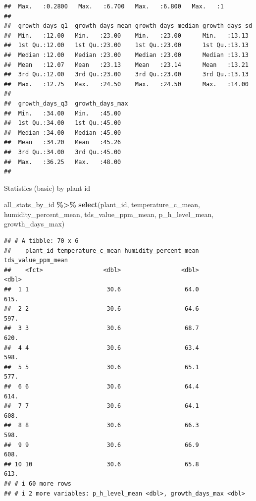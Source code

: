 \documentclass[
]{article}
\newenvironment{Shaded}{\begin{snugshade}}{\end{snugshade}}
\newcommand{\FunctionTok}[1]{\textcolor[rgb]{0.13,0.29,0.53}{\textbf{#1}}}
\newcommand{\NormalTok}[1]{#1}
\newcommand{\SpecialCharTok}[1]{\textcolor[rgb]{0.81,0.36,0.00}{\textbf{#1}}}
\begin{document}
\begin{verbatim}
##  Max.   :0.2800   Max.   :6.700   Max.   :6.800   Max.   :1      
##                                                                  
##  growth_days_q1  growth_days_mean growth_days_median growth_days_sd 
##  Min.   :12.00   Min.   :23.00    Min.   :23.00      Min.   :13.13  
##  1st Qu.:12.00   1st Qu.:23.00    1st Qu.:23.00      1st Qu.:13.13  
##  Median :12.00   Median :23.00    Median :23.00      Median :13.13  
##  Mean   :12.07   Mean   :23.13    Mean   :23.14      Mean   :13.21  
##  3rd Qu.:12.00   3rd Qu.:23.00    3rd Qu.:23.00      3rd Qu.:13.13  
##  Max.   :12.75   Max.   :24.50    Max.   :24.50      Max.   :14.00  
##                                                                     
##  growth_days_q3  growth_days_max
##  Min.   :34.00   Min.   :45.00  
##  1st Qu.:34.00   1st Qu.:45.00  
##  Median :34.00   Median :45.00  
##  Mean   :34.20   Mean   :45.26  
##  3rd Qu.:34.00   3rd Qu.:45.00  
##  Max.   :36.25   Max.   :48.00  
## 
\end{verbatim}

Statistics (basic) by plant id

\begin{Shaded}
\begin{Highlighting}[]
\NormalTok{all\_stats\_by\_id }\SpecialCharTok{\%\textgreater{}\%} 
  \FunctionTok{select}\NormalTok{(plant\_id, }
\NormalTok{         temperature\_c\_mean,}
\NormalTok{         humidity\_percent\_mean,}
\NormalTok{         tds\_value\_ppm\_mean,}
\NormalTok{         p\_h\_level\_mean,}
\NormalTok{         growth\_days\_max)}
\end{Highlighting}
\end{Shaded}

\begin{verbatim}
## # A tibble: 70 x 6
##    plant_id temperature_c_mean humidity_percent_mean tds_value_ppm_mean
##    <fct>                 <dbl>                 <dbl>              <dbl>
##  1 1                      30.6                  64.0               615.
##  2 2                      30.6                  64.6               597.
##  3 3                      30.6                  68.7               620.
##  4 4                      30.6                  63.4               598.
##  5 5                      30.6                  65.1               577.
##  6 6                      30.6                  64.4               614.
##  7 7                      30.6                  64.1               608.
##  8 8                      30.6                  66.3               598.
##  9 9                      30.6                  66.9               608.
## 10 10                     30.6                  65.8               613.
## # i 60 more rows
## # i 2 more variables: p_h_level_mean <dbl>, growth_days_max <dbl>
\end{verbatim}
\end{document}
